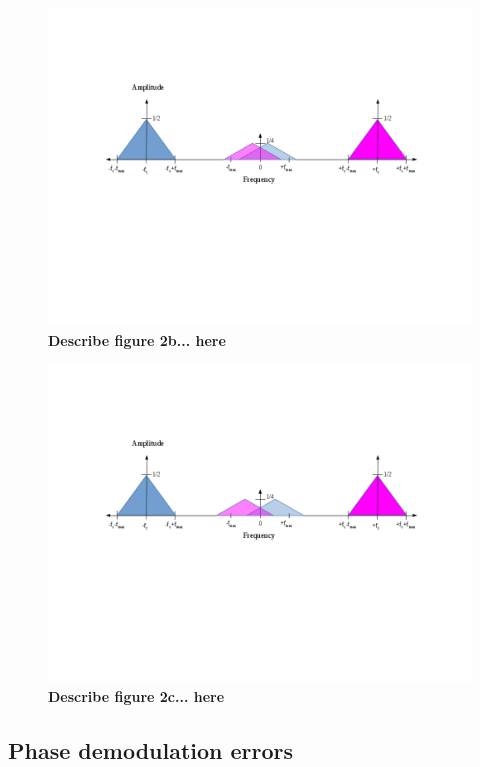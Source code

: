 \documentclass[letterpaper,12pt]{article}
\begin{document}
\begin{figure}[ht] 
\includegraphics[width=1.0\columnwidth]{prelab1-figure2b}
\caption{
\label{fig:hw1-figure2b}
{\bf Describe  figure 2b...
here}
}
\end{figure}

\begin{figure}[ht] 
\includegraphics[width=1.0\columnwidth]{prelab1-figure2c}
\caption{
\label{fig:hw1-figure2c}
{\bf Describe  figure 2c...
here}
}
\end{figure}

\subsection{Phase demodulation errors}
\end{document}
